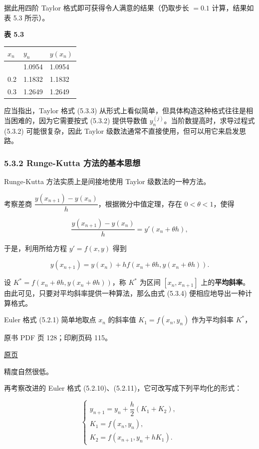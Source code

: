 据此用四阶 Taylor 格式即可获得令人满意的结果（仍取步长 \(=0.1\) 计算，结果如表 5.3 所示）。

\textbf{表 5.3}

{\def\LTcaptype{none} %
\begin{longtable}[]{@{}lll@{}}
\toprule\noalign{}
\(x_n\) & \(y_n\) & \(y(x_n)\) \\
\midrule\noalign{}
\endhead
\bottomrule\noalign{}
\endlastfoot
0.1 & 1.0954 & 1.0954 \\
0.2 & 1.1832 & 1.1832 \\
0.3 & 1.2649 & 1.2649 \\
\end{longtable}
}

应当指出，Taylor 格式 (5.3.3) 从形式上看似简单，但具体构造这种格式往往是相当困难的，因为它需要按式 (5.3.2) 提供导数值 \(y_n^{(j)}\)。当阶数提高时，求导过程式 (5.3.2) 可能很复杂，因此 Taylor 级数法通常不直接使用，但可以用它来启发思路。

\subsubsection{5.3.2 Runge-Kutta 方法的基本思想}\label{ch05a-runge-kutta-ux65b9ux6cd5ux7684ux57faux672cux601dux60f3}

Runge-Kutta 方法实质上是间接地使用 Taylor 级数法的一种方法。

考察差商 \(\dfrac{y(x_{n+1})-y(x_n)}{h}\)，根据微分中值定理，存在 \(0<\theta<1\)，使得

\[
\frac{y(x_{n+1})-y(x_n)}{h}=y'(x_n+\theta h),
\]

于是，利用所给方程 \(y'=f(x,y)\) 得到

\[
y(x_{n+1})=y(x_n)+hf(x_n+\theta h,y(x_n+\theta h)).\tag{5.3.4}
\]

设 \(K^*=f(x_n+\theta h,y(x_n+\theta h))\)，称 \(K^*\) 为区间 \([x_n,x_{n+1}]\) 上的\textbf{平均斜率}。由此可见，只要对平均斜率提供一种算法，那么由式 (5.3.4) 便相应地导出一种计算格式。

Euler 格式 (5.2.1) 简单地取点 \(x_n\) 的斜率值 \(K_1=f(x_n,y_n)\) 作为平均斜率 \(K^*\)，

\clearpage

原书 PDF 页 128；印刷页码 115。

\href{source-images/pdf-128.jpeg}{原页}

精度自然很低。

再考察改进的 Euler 格式 (5.2.10)、(5.2.11)，它可改写成下列平均化的形式：

\[
\begin{cases}
y_{n+1}=y_n+\dfrac{h}{2}(K_1+K_2),\\
K_1=f(x_n,y_n),\\
K_2=f(x_{n+1},y_n+hK_1).
\end{cases}
\]

